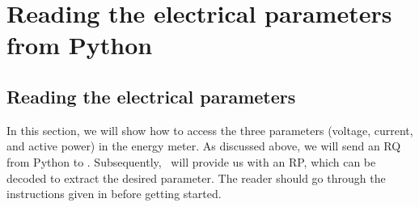 


\section{Reading the electrical parameters from Python}
\subsection{Reading the electrical parameters}
In this section, we will show how to access the three parameters (voltage, current, and active power) in the energy meter. As discussed above, we will send an RQ from Python to \arduino. Subsequently, \arduino\ will provide us with an RP, which can be decoded to extract the desired parameter. The reader should go through the instructions given in  before getting started. 

